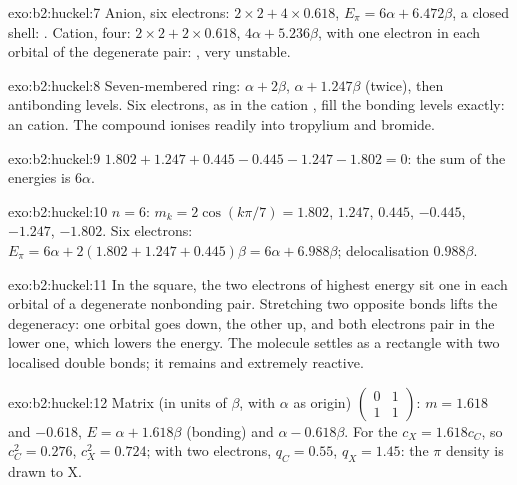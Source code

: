 \begin{solution}{exo:b2:huckel:7}
Anion, six electrons: $2 \times 2 + 4 \times 0.618$, $E_\pi = 6\alpha + 6.472\beta$, a closed shell:
. Cation, four: $2 \times 2 + 2 \times 0.618$, $4\alpha + 5.236\beta$, with one electron
in each orbital of the degenerate pair: , very unstable.
\end{solution}

\begin{solution}{exo:b2:huckel:8}
Seven-membered ring: $\alpha + 2\beta$, $\alpha + 1.247\beta$ (twice), then antibonding levels. Six
electrons, as in the cation , fill the bonding levels exactly: an 
cation. The compound ionises readily into tropylium and bromide.
\end{solution}

\begin{solution}{exo:b2:huckel:9}
$1.802 + 1.247 + 0.445 - 0.445 - 1.247 - 1.802 = 0$: the sum of the energies is $6\alpha$.
\end{solution}

\begin{solution}{exo:b2:huckel:10}
$n = 6$: $m_k = 2\cos(k\pi/7) = 1.802$, $1.247$, $0.445$, $-0.445$, $-1.247$, $-1.802$. Six
electrons: $E_\pi = 6\alpha + 2(1.802 + 1.247 + 0.445)\beta = 6\alpha + 6.988\beta$;
delocalisation $0.988\beta$.
\end{solution}

\begin{solution}{exo:b2:huckel:11}
In the square, the two electrons of highest energy sit one in each orbital of a
degenerate nonbonding pair. Stretching two opposite bonds lifts the degeneracy:
one orbital goes down, the other up, and both electrons pair in the lower one, which
lowers the energy. The molecule settles as a rectangle with two localised double
bonds; it remains  and extremely reactive.
\end{solution}

\begin{solution}{exo:b2:huckel:12}
Matrix (in units of $\beta$, with $\alpha$ as origin) $\begin{pmatrix}0 & 1\\ 1 & 1\end{pmatrix}$:
$m = 1.618$ and $-0.618$, $E = \alpha + 1.618\beta$ (bonding) and $\alpha - 0.618\beta$. For the
 $c_X = 1.618c_C$, so $c_C^2 = 0.276$, $c_X^2 = 0.724$; with two electrons,
$q_C = 0.55$, $q_X = 1.45$: the $\pi$ density is drawn to X.
\end{solution}

